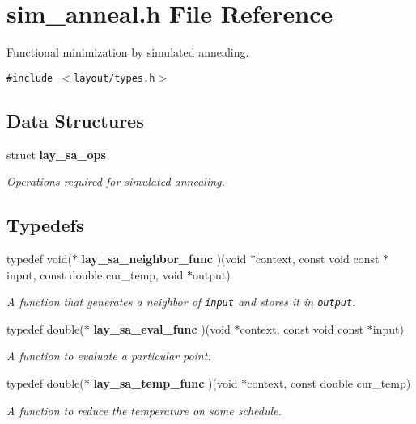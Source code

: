 \section{sim\_\-anneal.h File Reference}
\label{sim__anneal_8h}
Functional minimization by simulated annealing.  


{\tt \#include $<$layout/types.h$>$}\par
\subsection*{Data Structures}
\begin{CompactItemize}
\item 
struct {\bf lay\_\-sa\_\-ops}
\begin{CompactList}\small\item\em Operations required for simulated annealing. \item\end{CompactList}\end{CompactItemize}
\subsection*{Typedefs}
\begin{CompactItemize}
\item 
typedef void($\ast$ {\bf lay\_\-sa\_\-neighbor\_\-func} )(void $\ast$context, const  void const $\ast$input, const  double cur\_\-temp, void $\ast$output)
\begin{CompactList}\small\item\em A function that generates a neighbor of {\tt input} and stores it in {\tt output}. \item\end{CompactList}\item 
typedef double($\ast$ {\bf lay\_\-sa\_\-eval\_\-func} )(void $\ast$context, const  void const $\ast$input)
\begin{CompactList}\small\item\em A function to evaluate a particular point. \item\end{CompactList}\item 
typedef double($\ast$ {\bf lay\_\-sa\_\-temp\_\-func} )(void $\ast$context, const  double cur\_\-temp)
\begin{CompactList}\small\item\em A function to reduce the temperature on some schedule. \item\end{CompactList}\end{CompactItemize}
